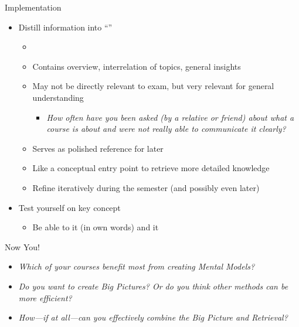\documentclass{ercisbeamer}
\begin{document}
\begin{frame}{Implementation}
    \begin{tbox}
        \begin{itemize}
            \item Distill information into ``''
            \begin{itemize}
                \item {}
                \item Contains overview, interrelation of topics, general insights
                \item May not be directly relevant to exam, but very relevant for general understanding
                \begin{itemize}
                    \item \emph{How often have you been asked (by a relative or friend) about what a course is about and were not really able to communicate it clearly?}
                \end{itemize}
                \item Serves as polished reference for later
                \item Like a conceptual entry point to retrieve more detailed knowledge
                \item Refine iteratively during the semester (and possibly even later)
            \end{itemize}
            \item Test yourself on key concept
            \begin{itemize}
                \item Be able to  it (in own words) and  it
            \end{itemize}
        \end{itemize}
    \end{tbox}
\end{frame}
\setbgimage{}

\begin{frame}{Now You!}
    \begin{itemize}
        \item \emph{Which of your courses benefit most from creating Mental Models?}
        \item \emph{Do you want to create Big Pictures? Or do you think other methods can be more efficient?}
        \item \emph{How---if at all---can you effectively combine the Big Picture and Retrieval?}
    \end{itemize}
\end{frame}
\end{document}
